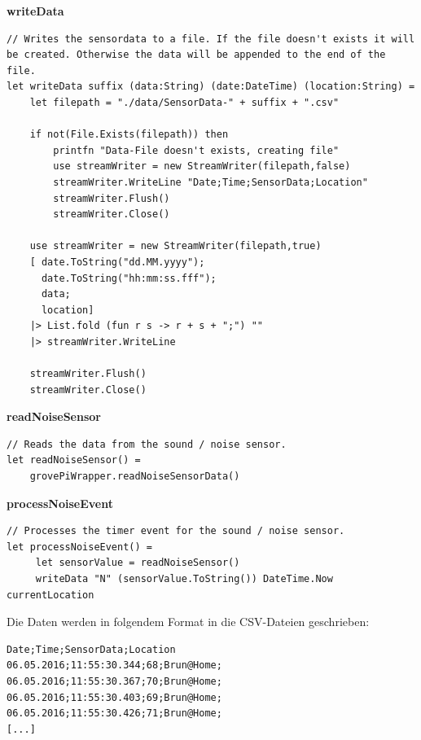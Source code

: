 \textbf{writeData}
\begin{lstlisting}
// Writes the sensordata to a file. If the file doesn't exists it will be created. Otherwise the data will be appended to the end of the file.
let writeData suffix (data:String) (date:DateTime) (location:String) = 
    let filepath = "./data/SensorData-" + suffix + ".csv"

    if not(File.Exists(filepath)) then
        printfn "Data-File doesn't exists, creating file"
        use streamWriter = new StreamWriter(filepath,false)
        streamWriter.WriteLine "Date;Time;SensorData;Location"
        streamWriter.Flush()
        streamWriter.Close()

    use streamWriter = new StreamWriter(filepath,true)
    [ date.ToString("dd.MM.yyyy");
      date.ToString("hh:mm:ss.fff");
      data;
      location]
    |> List.fold (fun r s -> r + s + ";") ""
    |> streamWriter.WriteLine

    streamWriter.Flush()
    streamWriter.Close()
\end{lstlisting} 

\textbf{readNoiseSensor}
\begin{lstlisting}
// Reads the data from the sound / noise sensor. 
let readNoiseSensor() = 
	grovePiWrapper.readNoiseSensorData()
\end{lstlisting}  
   
   
\textbf{processNoiseEvent}
\begin{lstlisting}
// Processes the timer event for the sound / noise sensor.
let processNoiseEvent() =
     let sensorValue = readNoiseSensor()
     writeData "N" (sensorValue.ToString()) DateTime.Now currentLocation
\end{lstlisting}

Die Daten werden in folgendem Format in die CSV-Dateien geschrieben:
\begin{lstlisting}
Date;Time;SensorData;Location
06.05.2016;11:55:30.344;68;Brun@Home;
06.05.2016;11:55:30.367;70;Brun@Home;
06.05.2016;11:55:30.403;69;Brun@Home;
06.05.2016;11:55:30.426;71;Brun@Home;
[...]
\end{lstlisting}